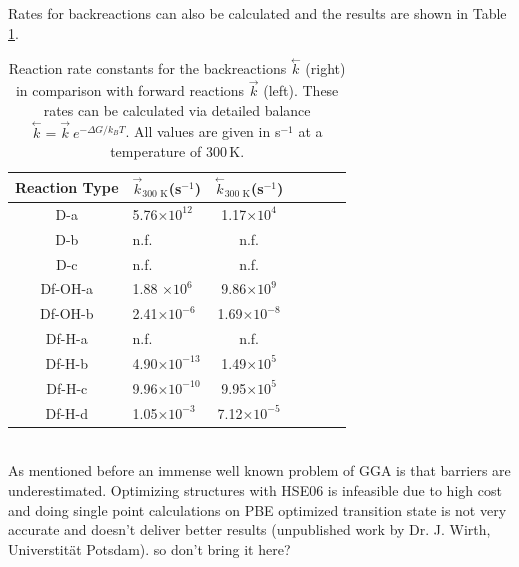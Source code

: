 \documentclass[11pt,DIV=13,BCOR=5mm,a4paper,headinclude]{scrbook}
\begin{document}
Rates for backreactions can also be calculated and the results are shown in Table \ref{tab:backreactions}.
\begin{table}[ht]
  \centering
  \caption{Reaction rate constants for the backreactions $\stackrel{\leftarrow}{k}$ (right) in comparison with forward reactions $\stackrel{\rightarrow}{k}$ (left).
These rates can be calculated via detailed balance $\stackrel{\leftarrow}{k}  = \stackrel{\rightarrow}{k} \ e^{-\Delta G/k_B T}$.
All values are given in s$^{-1}$ at a temperature of $300\,$K.}
  \begin{tabular}{cl|cc|cc|c}
  \toprule
\small{Reaction Type} & \small{$\stackrel{\rightarrow}{k}_\textrm{300 K}$(s$^{-1}$)} &  \small{$\stackrel{\leftarrow}{k}_\textrm{300 K}$(s$^{-1}$)} \\\midrule
 \small{D-a}   & \small{5.76$\times 10^{12}$} &\small{1.17$\times 10^4$}\\
 \small{D-b}   & \small{n.f.} & \small{n.f.} \\
 \small{D-c}   & \small{n.f.} & \small{n.f.}  \\\midrule
 \small{Df-OH-a} & \small{1.88 $\times  10^6$}&\small{9.86$\times 10^9$} \\
 \small{Df-OH-b}  & \small{2.41$\times 10^{-6}$}& \small{1.69$\times 10^{-8}$}\\\midrule
 \small{Df-H-a} & \small{n.f.} &\small{n.f.} \\
 \small{Df-H-b}  & \small{4.90$\times 10^{-13}$} &\small{1.49$\times 10^5$} \\
 \small{Df-H-c} & \small{9.96$\times 10^{-10}$}& \small{9.95$\times 10^5$}\\
 \small{Df-H-d} & \small{1.05$\times 10^{-3}$} &\small{7.12$\times 10^{-5}$} \\\bottomrule
  \end{tabular}
  \label{tab:backreactions}
\end{table}
\\
As mentioned before an immense well known problem of GGA is that barriers are underestimated\cite{Zhao05}.
Optimizing structures with HSE06 is infeasible due to high cost and doing single point calculations on PBE optimized transition state is not very accurate and doesn't deliver better results (unpublished work by Dr. J. Wirth, Universtität Potsdam).
so don't bring it here?
\clearpage
\end{document}
